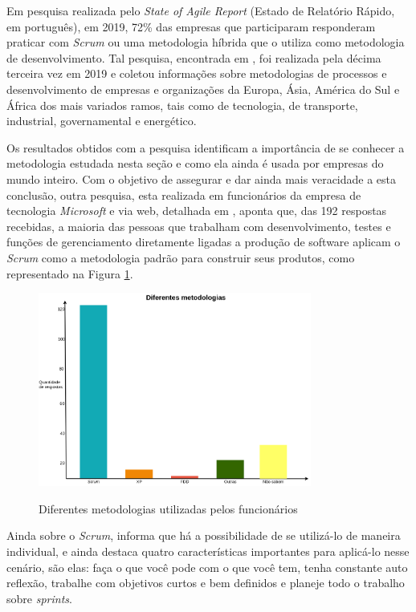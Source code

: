 Em pesquisa realizada pelo \textit{State of Agile Report} (Estado de Relatório Rápido, em português), em 2019, 72\% das empresas que participaram responderam praticar com \textit{Scrum} ou uma metodologia híbrida que o utiliza como metodologia de desenvolvimento. Tal pesquisa, encontrada em , foi realizada pela décima terceira vez em 2019 e coletou informações sobre metodologias de processos e desenvolvimento de empresas e organizações da Europa, Ásia, América do Sul e África dos mais variados ramos, tais como de tecnologia, de transporte, industrial, governamental e energético.

Os resultados obtidos com a pesquisa identificam a importância de se conhecer a metodologia estudada nesta seção e como ela ainda é usada por empresas do mundo inteiro. Com o objetivo de assegurar e dar ainda mais veracidade a esta conclusão, outra pesquisa, esta realizada em funcionários da empresa de tecnologia \textit{Microsoft} e via web, detalhada em , aponta que, das 192 respostas recebidas, a maioria das pessoas que trabalham com desenvolvimento, testes e funções de gerenciamento diretamente ligadas a produção de software aplicam o \textit{Scrum} como a metodologia padrão para construir seus produtos, como representado na Figura \ref{ageis-microsoft}. 

\begin{figure}[htb]
 \centering
 \caption{Diferentes metodologias utilizadas pelos funcionários}
 \includegraphics[width=0.8\textwidth]{figuras/diferentes-metodologias}
 \label{ageis-microsoft}
\end{figure}

Ainda sobre o \textit{Scrum},  informa que há a possibilidade de se utilizá-lo de maneira individual, e ainda destaca quatro características importantes para aplicá-lo nesse cenário, são elas: faça o que você pode com o que você tem, tenha constante auto reflexão, trabalhe com objetivos curtos e bem definidos e planeje todo o trabalho sobre \textit{sprints}.

